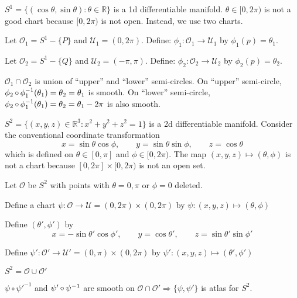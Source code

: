 \documentclass[a4paper,11pt]{article}
\begin{document}
	\begin{ex}
		$S^1 = \{(\cos \theta, \sin \theta): \theta \in \mathbb{R}\}$ is a 1d differentiable manifold. $\theta\in [0,2\pi)$ is not a good chart because $[0,2\pi)$ is not open. Instead, we use two charts. 
		
		Let $\mathcal{O}_1 = S^1 - \{P\}$ and $\mathcal{U}_1 = (0,2\pi)$. Define: $\phi_1: \mathcal{O}_1 \to \mathcal{U}_1$ by $\phi_1(p) = \theta_1$. 
		
		Let $\mathcal{O}_2 = S^1 - \{Q\}$ and $\mathcal{U}_2 = (-\pi,\pi)$. Define: $\phi_2: \mathcal{O}_2 \to \mathcal{U}_2$ by $\phi_2(p) = \theta_2$. 
		
		$\mathcal{O}_1 \cap \mathcal{O}_2$ is union of ``upper'' and ``lower'' semi-circles. On ``upper'' semi-circle, $\phi_2 \operatorname{\circ} \phi_1^{-1}(\theta_1) = \theta_2 = \theta_1$ is smooth. On ``lower'' semi-circle, $\phi_2 \operatorname{\circ} \phi_1^{-1}(\theta_1) = \theta_2 = \theta_1 - 2\pi$ is also smooth.
	\end{ex}

	\begin{ex}
		$S^2 = \{(x,y,z)\in \mathbb{R}^3 : x^2+y^2+z^2 = 1\}$ is a 2d differentiable manifold. Consider the conventional coordinate transformation $$x = \sin \theta \cos \phi,\qquad y = \sin \theta \sin \phi,\qquad z = \cos\theta$$ which is defined on $\theta \in [0,\pi]$ and $\phi \in [0,2\pi)$. The map $(x,y,z) \mapsto (\theta, \phi)$ is not a chart because $[0,2\pi]\times [0,2\pi)$ is not an open set.
		
		Let $\mathcal{O}$ be $S^2$ with points with $\theta = 0, \pi$ or $\phi = 0$ deleted.

		Define a chart $\psi: \mathcal{O} \to \mathcal{U} = (0,2\pi) \times (0,2\pi)$ by $\psi: (x,y,z) \mapsto (\theta,\phi)$
		
		Define $(\theta', \phi')$ by
		\[
			x = -\sin \theta' \cos \phi', \qquad y = \cos \theta', \qquad z = \sin\theta'\sin\phi' 
		\]

		Define $\psi' : \mathcal{O}' \to \mathcal{U}' = (0,\pi)\times (0,2\pi)$ by $\psi' : (x,y,z) \mapsto (\theta',\phi')$ 
		
		$S^2  = \mathcal{O} \cup \mathcal{O}'$

		$\psi \circ \psi'^{-1}$ and $\psi' \operatorname{\circ} \psi^{-1}$ are smooth on $\mathcal{O} \cap \mathcal{O}' \Rightarrow \{\psi,\psi'\}$ is atlas for $S^2$. 
	\end{ex}
\end{document}
